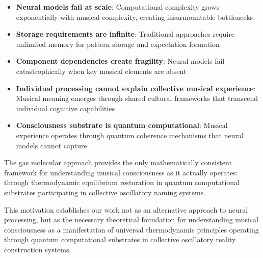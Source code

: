 \begin{itemize}
\item \textbf{Neural models fail at scale}: Computational complexity grows exponentially with musical complexity, creating insurmountable bottlenecks
\item \textbf{Storage requirements are infinite}: Traditional approaches require unlimited memory for pattern storage and expectation formation
\item \textbf{Component dependencies create fragility}: Neural models fail catastrophically when key musical elements are absent
\item \textbf{Individual processing cannot explain collective musical experience}: Musical meaning emerges through shared cultural frameworks that transcend individual cognitive capabilities
\item \textbf{Consciousness substrate is quantum computational}: Musical experience operates through quantum coherence mechanisms that neural models cannot capture
\end{itemize}

The gas molecular approach provides the only mathematically consistent framework for understanding musical consciousness as it actually operates: through thermodynamic equilibrium restoration in quantum computational substrates participating in collective oscillatory naming systems.

This motivation establishes our work not as an alternative approach to neural processing, but as the necessary theoretical foundation for understanding musical consciousness as a manifestation of universal thermodynamic principles operating through quantum computational substrates in collective oscillatory reality construction systems.
